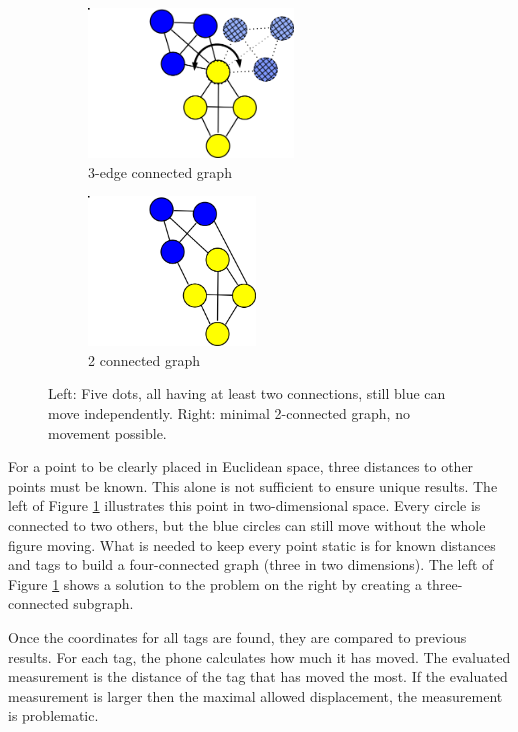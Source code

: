 \begin{figure}[ht!]
	\begin{subfigure}{.4\linewidth}
		\centering
		\includegraphics[height=150px]{graphics/schematics/connected_dots.png}
		\caption{3-edge connected graph}
	\end{subfigure}
\hspace{1cm}
	\begin{subfigure}{.4\linewidth}
		\centering
		\includegraphics[height=150px]{graphics/schematics/connected_dots_k_connected.png}
		\caption{2 connected graph}
	\end{subfigure}
	\caption{ Left: Five dots, all having at least two connections, still blue can move independently. Right: minimal 2-connected graph, no movement possible. }
	\label{f:connected_dots}
\end{figure}

For a point to be clearly placed in Euclidean space, three distances to other points must be known.
This alone is not sufficient to ensure unique results.
The left of Figure \ref{f:connected_dots} illustrates this point in two-dimensional space.
Every circle is connected to two others, but the blue circles can still move without the whole figure moving.
What is needed to keep every point static is for known distances and tags to build a four-connected graph (three in two dimensions).
The left of Figure \ref{f:connected_dots} shows a solution to the problem on the right by creating a three-connected subgraph.

Once the coordinates for all tags are found, they are compared to previous results.
For each tag, the phone calculates how much it has moved.
The evaluated measurement is the distance of the tag that has moved the most.
If the evaluated measurement is larger then the maximal allowed displacement, the measurement is problematic.



